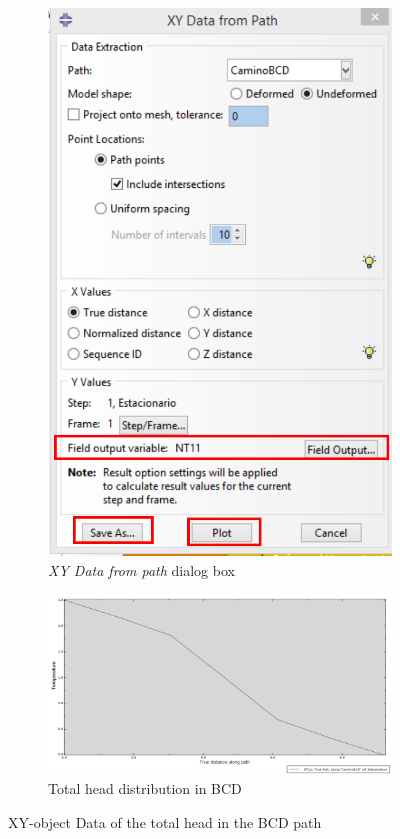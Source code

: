 \begin{itemize}
\begin{figure}[!h]
\begin{subfigure}[!h]{0.33\textwidth}
      \includegraphics[width=\textwidth]{./body/images/post33.pdf}
      \caption{\textit{XY Data from path} dialog box}
      \label{post33}
    \end{subfigure}%

    \begin{subfigure}[!h]{0.80\textwidth}
      \includegraphics[width=\textwidth]{./body/images/post34}
      \caption{Total head distribution in BCD}
      \label{post34}
    \end{subfigure}%
    \caption{XY-object Data of the total head in the BCD path}
  \end{figure}


\end{itemize}
